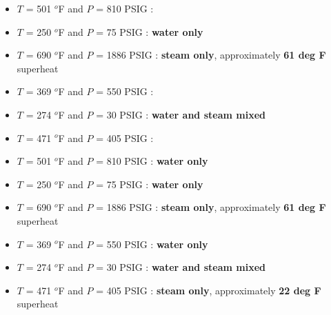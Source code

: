 \begin{itemize}
\item{} $T$ = 501 $^{o}$F and $P$ = 810 PSIG :
\item{} $T$ = 250 $^{o}$F and $P$ = 75 PSIG : {\bf water only}
\item{} $T$ = 690 $^{o}$F and $P$ = 1886 PSIG : {\bf steam only}, approximately {\bf 61 deg F} superheat
\item{} $T$ = 369 $^{o}$F and $P$ = 550 PSIG :
\item{} $T$ = 274 $^{o}$F and $P$ = 30 PSIG  : {\bf water and steam mixed}
\item{} $T$ = 471 $^{o}$F and $P$ = 405 PSIG : 
\end{itemize}







\begin{itemize}
\item{} $T$ = 501 $^{o}$F and $P$ = 810 PSIG : {\bf water only}
\item{} $T$ = 250 $^{o}$F and $P$ = 75 PSIG : {\bf water only}
\item{} $T$ = 690 $^{o}$F and $P$ = 1886 PSIG : {\bf steam only}, approximately {\bf 61 deg F} superheat
\item{} $T$ = 369 $^{o}$F and $P$ = 550 PSIG : {\bf water only}
\item{} $T$ = 274 $^{o}$F and $P$ = 30 PSIG  : {\bf water and steam mixed}
\item{} $T$ = 471 $^{o}$F and $P$ = 405 PSIG : {\bf steam only}, approximately {\bf 22 deg F} superheat
\end{itemize}





